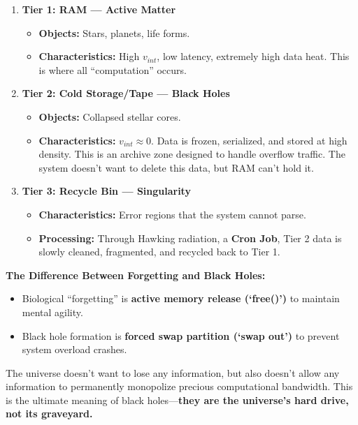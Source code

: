 \begin{enumerate}
\item \textbf{Tier 1: RAM --- Active Matter}

    \begin{itemize}
    \item \textbf{Objects:} Stars, planets, life forms.

    \item \textbf{Characteristics:} High \textbf{$v_{int}$}, low latency, extremely high data heat. This is where all ``computation'' occurs.
    \end{itemize}

\item \textbf{Tier 2: Cold Storage/Tape --- Black Holes}

    \begin{itemize}
    \item \textbf{Objects:} Collapsed stellar cores.

    \item \textbf{Characteristics:} \textbf{$v_{int} \approx 0$}. Data is frozen, serialized, and stored at high density. This is an archive zone designed to handle overflow traffic. The system doesn't want to delete this data, but RAM can't hold it.
    \end{itemize}

\item \textbf{Tier 3: Recycle Bin --- Singularity}

    \begin{itemize}
    \item \textbf{Characteristics:} Error regions that the system cannot parse.

    \item \textbf{Processing:} Through Hawking radiation, a \textbf{Cron Job}, Tier 2 data is slowly cleaned, fragmented, and recycled back to Tier 1.
    \end{itemize}
\end{enumerate}

\textbf{The Difference Between Forgetting and Black Holes:}

\begin{itemize}
\item Biological ``forgetting'' is \textbf{active memory release (`free()')} to maintain mental agility.

\item Black hole formation is \textbf{forced swap partition (`swap out')} to prevent system overload crashes.
\end{itemize}

The universe doesn't want to lose any information, but also doesn't allow any information to permanently monopolize precious computational bandwidth. This is the ultimate meaning of black holes---\textbf{they are the universe's hard drive, not its graveyard.}

